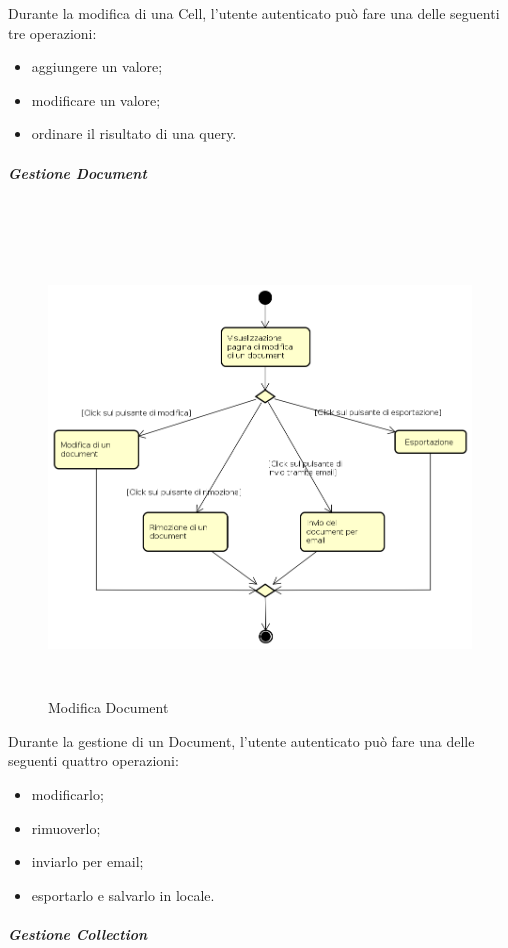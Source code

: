 Durante la modifica di una Cell, l'utente autenticato può fare una delle seguenti tre operazioni:
\begin{itemize}
\item aggiungere un valore;
\item modificare un valore;
\item ordinare il risultato di una query.
\end{itemize}
\newpage
\subparagraph{Gestione Document} \mbox{} \\
\begin{figure}[H]
\begin{center}
\includegraphics[height=12cm]{res/sections/backend/activities/modificaDocument.png}
\caption{Modifica Document}
\end{center}
\end{figure}
Durante la gestione di un Document, l'utente autenticato può fare una delle seguenti quattro operazioni:
\begin{itemize}
\item modificarlo;
\item rimuoverlo;
\item inviarlo per email;
\item esportarlo e salvarlo in locale.
\end{itemize}
\newpage
\subparagraph{Gestione Collection} \mbox{} \\
